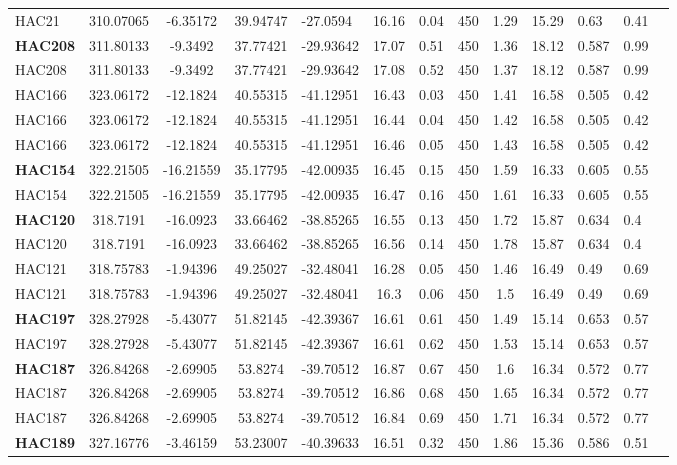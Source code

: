 \documentclass[a4paper,12pt]{article}
\begin{document}
\begin{longtable}{@{\extracolsep{\fill}}lccclccccrlll@{}}
HAC21 & 310.07065 & -6.35172 & 39.94747 & -27.0594 & 16.16 & 0.04 & 450 & 1.29 & 15.29 & 0.63 & 0.41 \\
\textbf{HAC208} & 311.80133 & -9.3492 & 37.77421 & -29.93642 & 17.07 & 0.51 & 450 & 1.36 & 18.12 & 0.587 & 0.99 \\
HAC208 & 311.80133 & -9.3492 & 37.77421 & -29.93642 & 17.08 & 0.52 & 450 & 1.37 & 18.12 & 0.587 & 0.99 \\
HAC166 & 323.06172 & -12.1824 & 40.55315 & -41.12951 & 16.43 & 0.03 & 450 & 1.41 & 16.58 & 0.505 & 0.42 \\
HAC166 & 323.06172 & -12.1824 & 40.55315 & -41.12951 & 16.44 & 0.04 & 450 & 1.42 & 16.58 & 0.505 & 0.42 \\
HAC166 & 323.06172 & -12.1824 & 40.55315 & -41.12951 & 16.46 & 0.05 & 450 & 1.43 & 16.58 & 0.505 & 0.42 \\
\textbf{HAC154} & 322.21505 & -16.21559 & 35.17795 & -42.00935 & 16.45 & 0.15 & 450 & 1.59 & 16.33 & 0.605 & 0.55 \\
HAC154 & 322.21505 & -16.21559 & 35.17795 & -42.00935 & 16.47 & 0.16 & 450 & 1.61 & 16.33 & 0.605 & 0.55 \\
\textbf{HAC120} & 318.7191 & -16.0923 & 33.66462 & -38.85265 & 16.55 & 0.13 & 450 & 1.72 & 15.87 & 0.634 & 0.4 \\
HAC120 & 318.7191 & -16.0923 & 33.66462 & -38.85265 & 16.56 & 0.14 & 450 & 1.78 & 15.87 & 0.634 & 0.4 \\
HAC121 & 318.75783 & -1.94396 & 49.25027 & -32.48041 & 16.28 & 0.05 & 450 & 1.46 & 16.49 & 0.49 & 0.69 \\
HAC121 & 318.75783 & -1.94396 & 49.25027 & -32.48041 & 16.3 & 0.06 & 450 & 1.5 & 16.49 & 0.49 & 0.69 \\
\textbf{HAC197} & 328.27928 & -5.43077 & 51.82145 & -42.39367 & 16.61 & 0.61 & 450 & 1.49 & 15.14 & 0.653 & 0.57 \\
HAC197 & 328.27928 & -5.43077 & 51.82145 & -42.39367 & 16.61 & 0.62 & 450 & 1.53 & 15.14 & 0.653 & 0.57 \\
\textbf{HAC187} & 326.84268 & -2.69905 & 53.8274 & -39.70512 & 16.87 & 0.67 & 450 & 1.6 & 16.34 & 0.572 & 0.77 \\
HAC187 & 326.84268 & -2.69905 & 53.8274 & -39.70512 & 16.86 & 0.68 & 450 & 1.65 & 16.34 & 0.572 & 0.77 \\
HAC187 & 326.84268 & -2.69905 & 53.8274 & -39.70512 & 16.84 & 0.69 & 450 & 1.71 & 16.34 & 0.572 & 0.77 \\
\textbf{HAC189} & 327.16776 & -3.46159 & 53.23007 & -40.39633 & 16.51 & 0.32 & 450 & 1.86 & 15.36 & 0.586 & 0.51 \\

\end{longtable}
\end{document}
